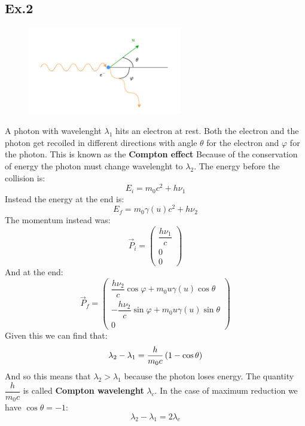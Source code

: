 \subsection{Ex.2}
\begin{figure}[H]
  \centering
  \includegraphics[width=0.6\textwidth]{res/svg/compton_effect.drawio}
\end{figure}
A photon with wavelenght $\lambda_1$ hits an electron at rest. Both the electron and the photon get recoiled in different directions with angle $\theta$ for the electron and $\varphi$ for the photon. This is known as the \textbf{Compton effect}
Because of the conservation of energy the photon must change wavelenght to $\lambda_2$. The energy before the collision is:
\begin{equation}
  E_i = m_0c^2 + h\nu_1
\end{equation}
Instead the energy at the end is:
\begin{equation}
  E_f = m_0\gamma (u) c^2 + h\nu_2
\end{equation}
The momentum instead was:
\begin{equation}
  \vec{P}_i = \begin{pmatrix}
    \dfrac{h\nu_1}{c} \\[8pt]
    0\\[8pt]
    0
  \end{pmatrix}
\end{equation}
And at the end:
\begin{equation}
  \vec{P}_f = \begin{pmatrix}
    \dfrac{h\nu_2}{c}\cos\varphi + m_0u\gamma(u)  \cos\theta \\[8pt]
    -\dfrac{h\nu_2}{c}\sin\varphi + m_0u\gamma(u)  \sin\theta \\[8pt]
    0
  \end{pmatrix}
\end{equation}
Given this we can find that:
\begin{equation}
  \lambda_2 - \lambda_1 = \dfrac{h}{m_0c}\left(1-\cos\theta\right)
\end{equation}
And so this means that $\lambda_2 > \lambda_1$ because the photon loses energy. The quantity $\dfrac{h}{m_0c}$ is called \textbf{Compton wavelenght} $\lambda_c$. In the case of maximum reduction we have $\cos\theta = -1$:
\begin{equation}
  \lambda_2-\lambda_1 = 2\lambda_c
\end{equation}
